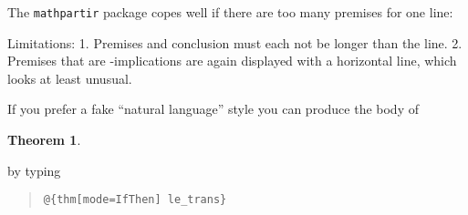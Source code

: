 \begin{isabellebody}
\begin{isamarkuptext}
The \texttt{mathpartir} package copes well if there are too many
premises for one line:
\begin{center}
\end{center}

Limitations: 1. Premises and conclusion must each not be longer than
the line.  2. Premises that are \isa{{\isasymLongrightarrow}}-implications are again
displayed with a horizontal line, which looks at least unusual.%
\end{isamarkuptext}%
\isamarkuptrue%
%
\isamarkuptrue%
%
\begin{isamarkuptext}%
If you prefer a fake ``natural language'' style you can produce
the body of
\newtheorem{theorem}{Theorem}
\begin{theorem}
\end{theorem}
by typing
\begin{quote}
\verb!@!\verb!{thm[mode=IfThen] le_trans}!
\end{quote}


\end{isamarkuptext}
\end{isabellebody}
